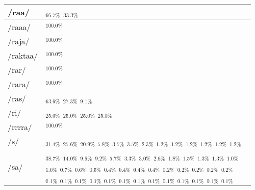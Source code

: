 \documentclass{article}
\begin{document}
\begin{longtable}{|l|p{}|}
/raa/ & \textIndus{}$_{66.7\%}$ \quad \textIndus{}$_{33.3\%}$ \\ \hline
/raaa/ & \textIndus{}$_{100.0\%}$ \\ \hline
/raja/ & \textIndus{}$_{100.0\%}$ \\ \hline
/raktaa/ & \textIndus{}$_{100.0\%}$ \\ \hline
/rar/ & \textIndus{}$_{100.0\%}$ \\ \hline
/rara/ & \textIndus{}$_{100.0\%}$ \\ \hline
/ras/ & \textIndus{}$_{63.6\%}$ \quad \textIndus{}$_{27.3\%}$ \quad \textIndus{}$_{9.1\%}$ \\ \hline
/ri/ & \textIndus{}$_{25.0\%}$ \quad \textIndus{}$_{25.0\%}$ \quad \textIndus{}$_{25.0\%}$ \quad \textIndus{}$_{25.0\%}$ \\ \hline
/rrrra/ & \textIndus{}$_{100.0\%}$ \\ \hline
/s/ & \textIndus{}$_{31.4\%}$ \quad \textIndus{}$_{25.6\%}$ \quad \textIndus{}$_{20.9\%}$ \quad \textIndus{}$_{5.8\%}$ \quad \textIndus{}$_{3.5\%}$ \quad \textIndus{}$_{3.5\%}$ \quad \textIndus{}$_{2.3\%}$ \quad \textIndus{}$_{1.2\%}$ \quad \textIndus{}$_{1.2\%}$ \quad \textIndus{}$_{1.2\%}$ \quad \textIndus{}$_{1.2\%}$ \quad \textIndus{}$_{1.2\%}$ \quad \textIndus{}$_{1.2\%}$ \\ \hline
/sa/ & \textIndus{}$_{38.7\%}$ \quad \textIndus{}$_{14.0\%}$ \quad \textIndus{}$_{9.6\%}$ \quad \textIndus{}$_{9.2\%}$ \quad \textIndus{}$_{5.7\%}$ \quad \textIndus{}$_{3.3\%}$ \quad \textIndus{}$_{3.0\%}$ \quad \textIndus{}$_{2.6\%}$ \quad \textIndus{}$_{1.8\%}$ \quad \textIndus{}$_{1.5\%}$ \quad \textIndus{}$_{1.3\%}$ \quad \textIndus{}$_{1.3\%}$ \quad \textIndus{}$_{1.0\%}$ \quad \textIndus{}$_{1.0\%}$ \quad \textIndus{}$_{0.7\%}$ \quad \textIndus{}$_{0.6\%}$ \quad \textIndus{}$_{0.5\%}$ \quad \textIndus{}$_{0.4\%}$ \quad \textIndus{}$_{0.4\%}$ \quad \textIndus{}$_{0.4\%}$ \quad \textIndus{}$_{0.4\%}$ \quad \textIndus{}$_{0.2\%}$ \quad \textIndus{}$_{0.2\%}$ \quad \textIndus{}$_{0.2\%}$ \quad \textIndus{}$_{0.2\%}$ \quad \textIndus{}$_{0.2\%}$ \quad \textIndus{}$_{0.1\%}$ \quad \textIndus{}$_{0.1\%}$ \quad \textIndus{}$_{0.1\%}$ \quad \textIndus{}$_{0.1\%}$ \quad \textIndus{}$_{0.1\%}$ \quad \textIndus{}$_{0.1\%}$ \quad \textIndus{}$_{0.1\%}$ \quad \textIndus{}$_{0.1\%}$ \quad \textIndus{}$_{0.1\%}$ \quad \textIndus{}$_{0.1\%}$ \quad \textIndus{}$_{0.1\%}$ \quad \textIndus{}$_{0.1\%}$ \quad \textIndus{}$_{0.1\%}$ \\ \hline

\end{longtable}
\end{document}
